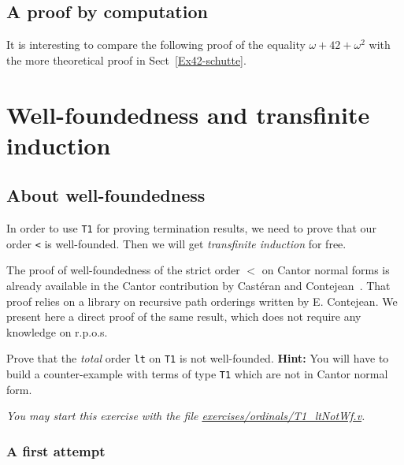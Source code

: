 \subsection{A proof by computation}
\label{Ex42-E0}

It is interesting to compare the following proof of the equality
$\omega+42+\omega^2$ with the more theoretical proof in Sect~\vref{Ex42-schutte}.


\section{Well-foundedness and transfinite induction}


\subsection{About  well-foundedness}
\label{sec:T1Wf}
\label{sec:orgheadline82}
   In order to use \texttt{T1} for proving termination results,
we need to prove that  our order \texttt{<} is well-founded. Then we will get \emph{transfinite induction} for free.


The proof of well-foundedness of the strict order $<$ on Cantor normal forms is already 
available in the Cantor contribution by Castéran and Contejean~\cite{CantorContrib}. That proof relies on a library on recursive path orderings written by
E. Contejean. We present here  a direct proof of the same result, which does not require any knowledge on r.p.o.s.


\begin{exercise}
Prove that the \emph{total} order \texttt{lt} on \texttt{T1} is not well-founded. 
\textbf{Hint:}  You will have to build a counter-example with terms of type \texttt{T1}
which are not in Cantor normal form.

\emph{You may start this exercise with the file
    \href{https://github.com/coq-community/hydra-battles/tree/master/exercises/ordinals/T1_ltNotWf.v}{exercises/ordinals/T1\_ltNotWf.v}.}
\end{exercise}

\subsubsection{A first attempt}
\label{sec:orgheadline77}

